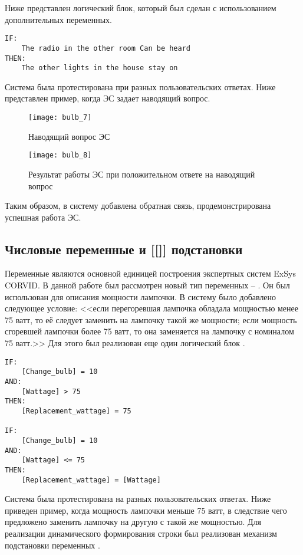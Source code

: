 Ниже представлен логический блок, который был сделан с использованием дополнительных переменных.

\begin{lstlisting}[caption={Алгоритм работы ЭС}]
IF:
	The radio in the other room Can be heard
THEN:
	The other lights in the house stay on
\end{lstlisting}

Система была протестирована при разных пользовательских ответах. Ниже представлен пример, когда ЭС задает наводящий вопрос.

\begin{figure}[H]
	\centering
	\texttt{[image: bulb\_7]}
	\caption{Наводящий вопрос ЭС}
\end{figure}

\begin{figure}[H]
	\centering
	\texttt{[image: bulb\_8]}
	\caption{Результат работы ЭС при положительном ответе на наводящий вопрос}
\end{figure}

Таким образом, в систему добавлена обратная связь, продемонстрирована успешная работа ЭС.

\subsection{Числовые переменные и [[]] подстановки}

Переменные являются основной единицей построения экспертных систем ExSys CORVID. В данной работе был рассмотрен новый тип переменных -- . Он был использован для описания мощности лампочки. В систему было добавлено следующее условие: <<если перегоревшая лампочка обладала мощностью менее 75 ватт, то её следует заменить на лампочку такой же мощности; если мощность сгоревшей лампочки более 75 ватт, то она заменяется на лампочку с номиналом 75 ватт.>> Для этого был реализован еще один логический блок .

\begin{lstlisting}[caption={Алгоритм работы ЭС}]
IF:
	[Change_bulb] = 10
AND:
	[Wattage] > 75
THEN:
	[Replacement_wattage] = 75

IF:
	[Change_bulb] = 10
AND:
	[Wattage] <= 75
THEN:
	[Replacement_wattage] = [Wattage]
\end{lstlisting}

Система была протестирована на разных пользовательских ответах. Ниже приведен пример, когда мощность лампочки меньше 75 ватт, в следствие чего предложено заменить лампочку на другую с такой же мощностью. Для реализации динамического формирования строки был реализован механизм подстановки переменных \code{[[]]}.

